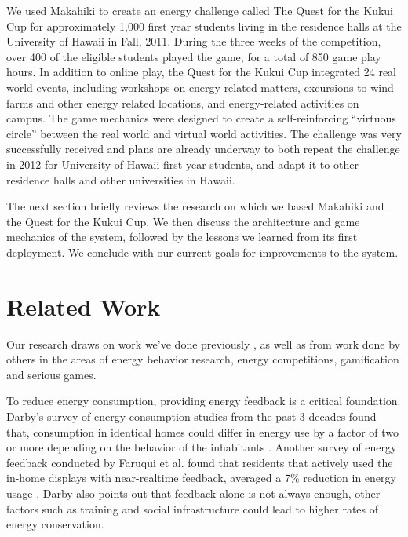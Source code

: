 \documentclass{acm_proc_article-sp}
\begin{document}
We used Makahiki to create an energy challenge called The Quest for the
Kukui Cup for approximately 1,000 first year students living in the
residence halls at the University of Hawaii in Fall, 2011.  During the
three weeks of the competition, over 400 of the eligible students played
the game, for a total of 850 game play hours.  In addition to online play,
the Quest for the Kukui Cup integrated 24 real world events, including
workshops on energy-related matters, excursions to wind farms and other
energy related locations, and energy-related activities on campus. The game
mechanics were designed to create a self-reinforcing ``virtuous circle''
between the real world and virtual world activities.  The challenge was
very successfully received and plans are already underway to both repeat
the challenge in 2012 for University of Hawaii first year students, and 
adapt it to other residence halls and other universities in Hawaii.

The next section briefly reviews the research on which we based Makahiki
and the Quest for the Kukui Cup.   We then discuss the architecture and
game mechanics of the system, followed by the lessons we learned from its
first deployment. We conclude with our current goals for improvements to
the system.

\section{Related Work}
Our research draws on work we've done previously
\cite{csdl2-11-03,csdl2-10-05,csdl2-10-07,csdl2-11-02}, as well as from
work done by others in the areas of energy behavior research, energy 
competitions, gamification and serious games. 

To reduce energy consumption, providing energy feedback is a critical 
foundation. Darby's survey of energy consumption studies from the past 3 
decades found  that, consumption in identical homes could differ in energy use 
by a factor of two or more depending on the behavior of the inhabitants
\cite{darby-review-2006}. Another survey of energy feedback conducted by 
Faruqui et al. found that residents that actively used the in-home displays 
with near-realtime feedback, averaged a 7\% reduction in energy usage
\cite{Faruqui09}. Darby also points out that feedback alone is not always 
enough, other factors such as training and social infrastructure could lead to 
higher rates of energy conservation\cite{darby-2000-making-it-obvious}.
\end{document}
